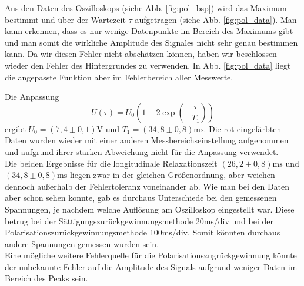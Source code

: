 Aus den Daten des Oszilloskops (siehe Abb. \ref{fig:pol_bsp}) wird das Maximum bestimmt und über der Wartezeit $\tau$ aufgetragen (siehe Abb. \ref{fig:pol_data}). Man kann erkennen, dass es nur wenige Datenpunkte im Bereich des Maximums gibt und man somit die wirkliche Amplitude des Signales nicht sehr genau bestimmen kann. Da wir diesen Fehler nicht abschätzen können, haben wir beschlossen wieder den Fehler des Hintergrundes zu verwenden. In Abb. \ref{fig:pol_data} liegt die angepasste Funktion aber im Fehlerbereich aller Messwerte.

Die Anpassung $$U(\tau) = U_0\left(1-2\exp{\left(-\frac{\tau}{T_1}\right)}\right)$$ ergibt $U_0 = (7,4\pm 0,1)\si{\volt}$ und $T_1 = (34,8\pm 0,8) \si{\milli\second}$. Die rot eingefärbten Daten wurden wieder mit einer anderen Messbereichseinstellung aufgenommen und aufgrund ihrer starken Abweichung nicht für die Anpassung verwendet.\\

Die beiden Ergebnisse für die longitudinale Relaxationszeit $(26,2\pm 0,8) \si{\milli\second}$ und $(34,8\pm 0,8) \si{\milli\second}$ liegen zwar in der gleichen Größenordnung, aber weichen dennoch außerhalb der Fehlertoleranz voneinander ab. Wie man bei den Daten aber schon sehen konnte, gab es durchaus Unterschiede bei den gemessenen Spannungen, je nachdem welche Auflösung am Oszilloskop eingestellt war. Diese betrug bei der Sättigungszurückgewinnungsmethode 20\si{\milli\second}/div und bei der Polarisationszurückgewinnungsmethode 100\si{\milli\second}/div. Somit könnten durchaus andere Spannungen gemessen wurden sein.\\
Eine mögliche weitere Fehlerquelle für die Polarisationszugrückgewinnung könnte der unbekannte Fehler auf die Amplitude des Signals aufgrund weniger Daten im Bereich des Peaks sein.


